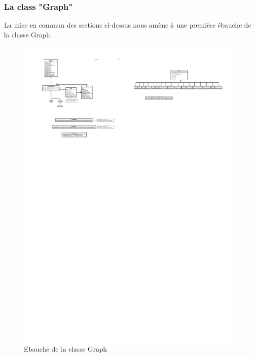 \documentclass[french]{article}
\begin{document}
			\subsubsection{La class "Graph"}
			La mise en commun des sections ci-dessus nous amène à une première ébauche de la classe Graph.
			\begin{figure}[H]
				\centering
				\includegraphics[scale=2.8]{Conception/classGraph.pdf}
				\caption{Ebauche de la classe Graph}
			\end{figure}
			
\end{document}
